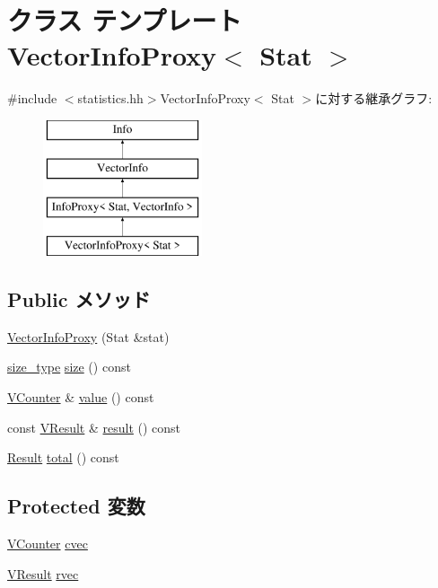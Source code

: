 \hypertarget{classStats_1_1VectorInfoProxy}{
\section{クラス テンプレート VectorInfoProxy$<$ Stat $>$}
\label{classStats_1_1VectorInfoProxy}
}


{\ttfamily \#include $<$statistics.hh$>$}VectorInfoProxy$<$ Stat $>$に対する継承グラフ:\begin{figure}[H]
\begin{center}
\leavevmode
\includegraphics[height=4cm]{classStats_1_1VectorInfoProxy}
\end{center}
\end{figure}
\subsection*{Public メソッド}
\begin{DoxyCompactItemize}
\item 
\hyperlink{classStats_1_1VectorInfoProxy_a852186b7ffb391d0f3c372fd087cf964}{VectorInfoProxy} (Stat \&stat)
\item 
\hyperlink{namespaceStats_ada51e68d31936547d3729c82daf6b7c6}{size\_\-type} \hyperlink{classStats_1_1VectorInfoProxy_a503ab01f6c0142145d3434f6924714e7}{size} () const 
\item 
\hyperlink{classstd_1_1vector}{VCounter} \& \hyperlink{classStats_1_1VectorInfoProxy_a1840628d1aea3c4fe5cf3ae375850a4a}{value} () const 
\item 
const \hyperlink{classstd_1_1vector}{VResult} \& \hyperlink{classStats_1_1VectorInfoProxy_aba312f9e3431b1652f8b3ddf3fe105dc}{result} () const 
\item 
\hyperlink{namespaceStats_ad874d2cfd4b4a29ebd480bb2e67f20ae}{Result} \hyperlink{classStats_1_1VectorInfoProxy_a35c6e2ed3fc81b40d69052a062113ead}{total} () const 
\end{DoxyCompactItemize}
\subsection*{Protected 変数}
\begin{DoxyCompactItemize}
\item 
\hyperlink{classstd_1_1vector}{VCounter} \hyperlink{classStats_1_1VectorInfoProxy_a8cc2f3a565a2e54ab797f717802bc894}{cvec}
\item 
\hyperlink{classstd_1_1vector}{VResult} \hyperlink{classStats_1_1VectorInfoProxy_a39641e85a212191bbc9d5d6293522515}{rvec}
\end{DoxyCompactItemize}
